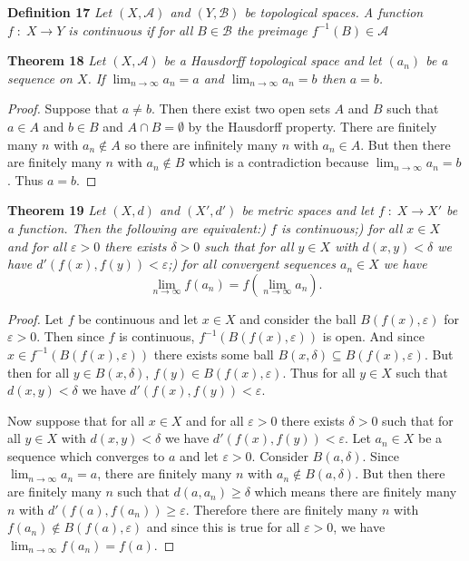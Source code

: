 \documentclass{article}
\begin{document}
\begin{flushleft}
\textbf{Definition 17}
\textsl{Let $(X, \mathcal{A})$ and $(Y, \mathcal{B})$ be topological spaces. A function $f \; : \; X \rightarrow Y$ is continuous if for all $B \in \mathcal{B}$ the preimage $f^{-1}(B) \in \mathcal{A}$}\newline

\textbf{Theorem 18}
\textsl{Let $(X, \mathcal{A})$ be a Hausdorff topological space and let $(a_n)$ be a sequence on $X$. If $\lim_{n \rightarrow \infty} a_n = a$ and $\lim_{n \rightarrow \infty} a_n = b$ then $a=b$.}
\begin{proof}
Suppose that $a \neq b$. Then there exist two open sets $A$ and $B$ such that $a \in A$ and $b \in B$ and $A \cap B = \emptyset$ by the Hausdorff property. There are finitely many $n$ with $a_n \notin A$ so there are infinitely many $n$ with $a_n \in A$. But then there are finitely many $n$ with $a_n \notin B$ which is a contradiction because $\lim_{n \rightarrow \infty} a_n = b$. Thus $a=b$.
\end{proof}

\textbf{Theorem 19}
\textsl{Let $(X,d)$ and $(X',d')$ be metric spaces and let $f \; : \; X \rightarrow X'$ be a function. Then the following are equivalent:) $f$ is continuous;) for all $x \in X$ and for all $\varepsilon > 0$ there exists $\delta > 0$ such that for all $y \in X$ with $d(x,y) < \delta$ we have $d'(f(x),f(y)) < \varepsilon$;) for all convergent sequences $a_n \in X$ we have
\[
\lim_{n \rightarrow \infty} f(a_n) = f \left ( \lim_{n \rightarrow \infty} a_n \right ).
\]}
\begin{proof}
Let $f$ be continuous and let $x \in X$ and consider the ball $B(f(x), \varepsilon)$ for $\varepsilon > 0$. Then since $f$ is continuous, $f^{-1}(B(f(x), \varepsilon))$ is open. And since $x \in f^{-1}(B(f(x), \varepsilon))$ there exists some ball $B(x, \delta) \subseteq B(f(x), \varepsilon)$. But then for all $y \in B(x, \delta)$, $f(y) \in B(f(x), \varepsilon)$. Thus for all $y \in X$ such that $d(x,y) < \delta$ we have $d'(f(x),f(y)) < \varepsilon$.\newline

Now suppose that for all $x \in X$ and for all $\varepsilon > 0$ there exists $\delta > 0$ such that for all $y \in X$ with $d(x,y) < \delta$ we have $d'(f(x),f(y)) < \varepsilon$. Let $a_n \in X$ be a sequence which converges to $a$ and let $\varepsilon > 0$. Consider $B(a, \delta)$. Since $\lim_{n \rightarrow \infty} a_n = a$, there are finitely many $n$ with $a_n \notin B(a, \delta)$. But then there are finitely many $n$ such that $d(a,a_n) \geq \delta$ which means there are finitely many $n$ with $d'(f(a),f(a_n)) \geq \varepsilon$. Therefore there are finitely many $n$ with $f(a_n) \notin B(f(a), \varepsilon)$ and since this is true for all $\varepsilon > 0$, we have $\lim_{n \rightarrow \infty} f(a_n) = f(a)$.\newline


\end{proof}
\end{flushleft}
\end{document}
